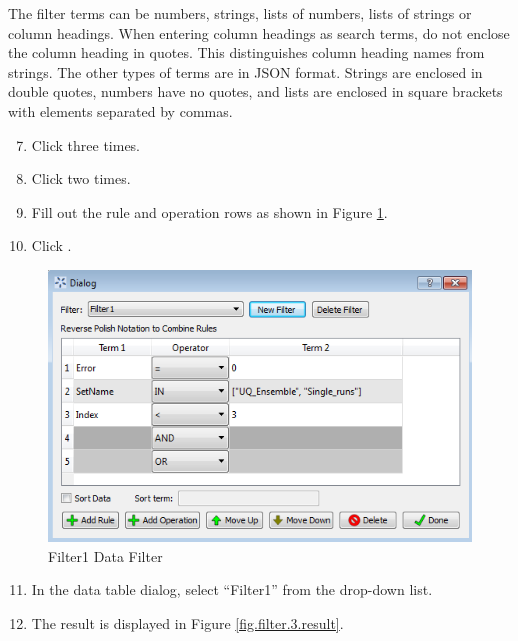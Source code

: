 The filter terms can be numbers, strings, lists of numbers, lists of strings or column headings. When entering column headings as search terms, do not enclose the column heading in quotes. This distinguishes column heading names from strings. The other types of terms are in JSON format. Strings are enclosed in double quotes, numbers have no quotes, and lists are enclosed in square brackets with elements separated by commas. 

\begin{enumerate}
	\setcounter{enumi}{6}
	\item Click  three times.
	\item Click  two times.
	\item Fill out the rule and operation rows as shown in Figure \ref{fig.filter.3}.
	\item Click .
\end{enumerate}

\begin{figure}[H]
	\begin{center}
		\includegraphics[scale=0.55]{Chapt_flowsheet/figs/filter_3}
		\caption{Filter1 Data Filter}
		\label{fig.filter.3}
	\end{center}
\end{figure}

\begin{enumerate}
	\setcounter{enumi}{10}
	\item In the data table dialog, select ``Filter1'' from the  drop-down list.
	\item The result is displayed in Figure \ref{fig.filter.3.result}.
\end{enumerate}

